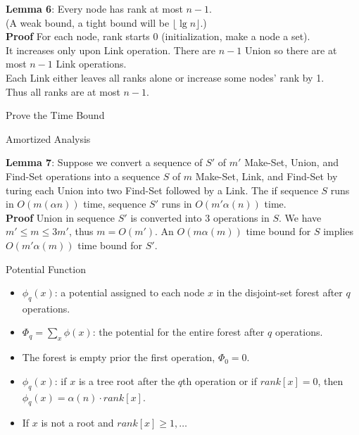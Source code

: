 \documentclass{beamer}
\begin{document}
\begin{frame}{}

{\bf Lemma 6}: Every node has rank at most $n-1$. \\
{\small (A weak bound, a tight bound will be $\lfloor \lg n\rfloor$.) }\\
{\bf Proof} For each node, rank starts 0 (initialization, make a node a set). \\
It increases only upon {\sc Link} operation. There are $n-1$ {\sc Union} so
 there are at most $n-1$ {\sc Link} operations. \\
Each {\sc Link} either leaves all ranks alone or increase some nodes' rank by 1. \\
Thus all ranks are at most $n-1$.  \\
\end{frame}

\begin{frame}{}

\centerline{\Large Prove the Time Bound}

\centerline{\large Amortized Analysis}

\end{frame}

\begin{frame}{}

{\bf Lemma 7}: Suppose we convert a sequence of $S'$ of $m'$ {\sc Make-Set}, {\sc Union}, and
{\sc Find-Set} operations into a sequence $S$ of $m$ {\sc Make-Set}, {\sc Link}, and
{\sc Find-Set} by turing each {\sc Union} into two {\sc Find-Set} followed by a {\sc Link}.
The if sequence $S$ runs in $O(m(\alpha n))$ time, sequence $S'$ runs in $O(m'\alpha(n))$
time. \\
{\bf Proof} {\sc Union} in sequence $S'$ is converted into 3 operations in $S$. We have
$m'\le m\le 3m'$, thus $m=O(m')$. An $O(m\alpha(m))$ time bound for $S$ implies $O(m'\alpha(m))$
time bound for $S'$.
\end{frame}

\begin{frame}{}

\centerline{\large Potential Function}
\begin{itemize}
\item $\phi_q(x)$: a potential assigned to each node $x$ in the disjoint-set forest after $q$
 operations. 
\item $\Phi_q=\sum_x\phi(x)$: the potential for the entire forest after $q$ operations. 
\item The forest is empty prior the first operation, $\Phi_0=0$. 
\item $\phi_q(x)$: if $x$ is a tree root after the $q$th operation or if $rank[x]=0$,
 then $\phi_q(x)=\alpha(n)\cdot rank[x]$. 
\item If $x$ is not a root and $rank[x]\ge 1, \ldots$
\end{itemize}
\end{frame}
\end{document}
